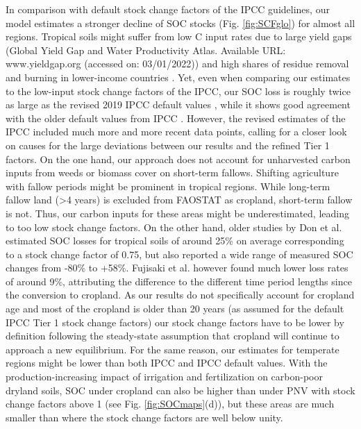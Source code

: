 \documentclass[gc, manuscript]{copernicus}
\begin{document}
In comparison with default stock change factors of the IPCC guidelines, our model estimates a stronger decline of SOC stocks (Fig. \ref{fig:SCFglo}) for almost all regions. Tropical soils might suffer from low C input rates due to large yield gaps (Global Yield Gap and Water Productivity Atlas. Available URL: www.yieldgap.org (accessed on: 03/01/2022)) and high shares of residue removal and burning in lower-income countries \citep{smil_crop_1999, williams_influence_1997, jain_emission_2014}. Yet, even when comparing our estimates to the low-input stock change factors of the IPCC, our SOC loss is roughly twice as large as the revised 2019 IPCC default values \citeyearpar{ogle_cropland_in_ipcc_2019}, while it shows good agreement with the older default values from IPCC \citeyearpar{lasco_cropland_in_ipcc_2006}. However, the revised estimates of the IPCC included much more and more recent data points, calling for a closer look on causes for the large deviations between our results and the refined Tier 1 factors.
On the one hand, our approach does not account for unharvested carbon inputs from weeds or biomass cover on short-term fallows. Shifting agriculture with fallow periods might be prominent in tropical regions. While long-term fallow land (\textgreater4 years) is excluded from FAOSTAT as cropland, short-term fallow is not. Thus, our carbon inputs for these areas might be underestimated, leading to too low stock change factors.
On the other hand, older studies by Don et al. \citeyearpar{don_impact_2011} estimated SOC losses for tropical soils of around 25\% on average corresponding to a stock change factor of 0.75, but also reported a wide range of measured SOC changes from -80\% to +58\%. Fujisaki et al. \citeyearpar{fujisaki_forest_2015} however found much lower loss rates of around 9\%, attributing the difference to the different time period lengths since the conversion to cropland. As our results do not specifically account for cropland age and most of the cropland is older than 20 years (as assumed for the default IPCC Tier 1 stock change factors) our stock change factors have to be lower by definition following the steady-state assumption that cropland will continue to approach a new equilibrium.
For the same reason, our estimates for temperate regions might be lower than both IPCC \citeyearpar{lasco_cropland_in_ipcc_2006} and IPCC \citeyearpar{ogle_cropland_in_ipcc_2019} default values.
With the production-increasing impact of irrigation and fertilization on carbon-poor dryland soils, SOC under cropland can also be higher than under PNV with stock change factors above 1 (see Fig. \ref{fig:SOCmaps}(d)), but these areas are much smaller than where the stock change factors are well below unity.
\end{document}
